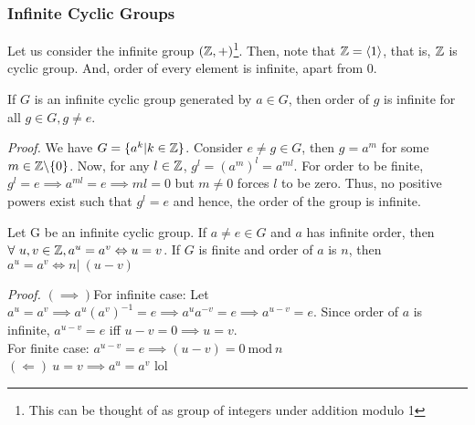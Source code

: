\subsubsection{Infinite Cyclic Groups}
Let us consider the infinite group $(\mathbb{Z}, +)$\footnote{This can be thought of as group of integers under addition modulo 1}. Then, note that $\mathbb{Z} = \left\langle 1 \right\rangle$, that is, $\mathbb{Z}$ is cyclic group. And, order of every element is infinite, apart from 0. 
\begin{lemma}
    If $G$ is an infinite cyclic group generated by $a\in G$, then order of $g$ is infinite for all $g\in G, g\neq e$.
\end{lemma}
\textit{Proof.} We have $G=\{a^k|k\in \mathbb{Z}\}$. Consider $e \neq g\in G$, then $g=a^m$ for some $m\in \mathbb{Z}\backslash \{0\}$. Now, for any $l\in \mathbb{Z}$, $g^l = (a^m)^l = a^{ml}$. For order to be finite, $g^l = e \implies a^{ml} = e \implies ml=0$ but $m\neq 0$ forces $l$ to be zero. Thus, no positive powers exist such that $g^l=e$ and hence, the order of the group is infinite. 
\begin{lemma}
    Let G be an infinite cyclic group. If $a\neq e \in G$ and $a$ has infinite order, then $\forall \ u,v\in \mathbb{Z}, a^u=a^v \Leftrightarrow u=v$. If $G$ is finite and order of $a$ is $n$, then $a^u=a^v\Leftrightarrow n| \ (u-v)$
\end{lemma}
\textit{Proof.} $(\implies)$For infinite case: Let $a^u = a^v \implies a^u (a^v)^{-1} = e \implies a^u a^{-v} = e \implies a^{u-v} = e$. Since order of $a$ is infinite, $a^{u-v} = e$ iff $u-v=0\implies u=v$.\\[0.3cm]
For finite case: $a^{u-v} = e \implies (u-v) = 0\ \mathrm{mod}\ n$ \\[0.3cm] 
$(\Longleftarrow)\ u = v \implies a^u = a^v$ lol  

